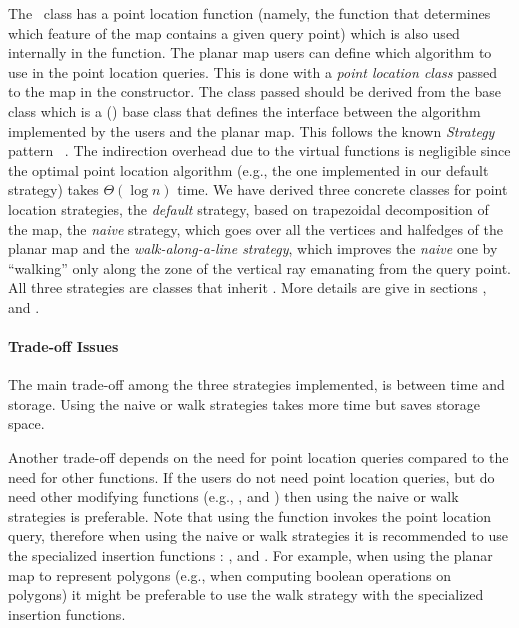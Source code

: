 The \ccClassTemplateName\ class has a point location function
(namely, the  function that determines which feature of the map 
contains a given query point)
which is also used internally in the  function.
The planar map users can define which algorithm to use in the
point location queries. This is done with a {\em point location class}
passed to the map in the constructor. The class passed should be derived
from the base class  which is a
() base class that defines the interface between the 
algorithm
implemented by the users and the planar map. This follows the 
known {\it Strategy}
pattern ~\cite{ghjv-dpero-95}. The indirection overhead due to the virtual functions is
negligible since the optimal point location algorithm 
(e.g., the one implemented in our default strategy) takes $\Theta(\log n)$ time.  
We have derived three concrete classes for point location strategies,
the {\it default\/} strategy, based on trapezoidal decomposition of the map,
the {\it naive\/} strategy, which goes over all the vertices and halfedges
of the planar map and the {\it walk-along-a-line strategy\/}, which improves
the {\it naive\/} one by ``walking'' only along the zone of the vertical ray emanating
from the query point. All three strategies are classes
that inherit .
More details are give in sections 
  , 
   and
  .


\paragraph{Trade-off Issues}
The main trade-off among the three strategies implemented, is between
time and storage. Using the naive or walk strategies takes more
time but saves storage space.

Another trade-off depends on the need for point location queries compared
to the need for other functions. If the users do not need point location 
queries, but do need other modifying functions (e.g., , 
 and ) then using the naive or walk strategies
is preferable. Note that using the  function invokes the
point location query, therefore when using the naive or walk strategies it
is recommended to use the specialized insertion functions : 
,  and 
.
For example, when using the planar map to represent polygons (e.g., when
computing boolean operations on polygons) it might be preferable to use
the walk strategy with the specialized insertion functions. 

